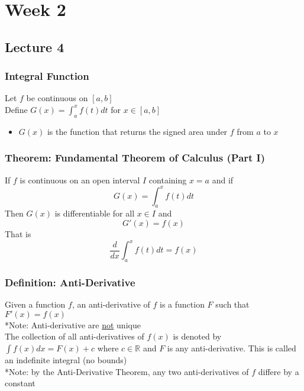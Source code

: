 \documentclass[12pt, letterpaper]{article}
\begin{document}
\section{Week 2}
\subsection{Lecture 4}
\subsubsection{Integral Function}
Let $f$ be continuous on $[a,b]$ \\
Define $G(x) = \displaystyle\int_{a}^{x}f(t)dt$ for $x\in[a,b]$
\begin{itemize}
    \item $G(x)$ is the function  that returns the signed area under $f$ from $a$ to $x$
\end{itemize}
\subsubsection{Theorem: Fundamental Theorem of Calculus (Part I)}
If $f$ is continuous on an open interval $I$ containing $x=a$ and if \[G(x) = \displaystyle\int_{a}^{x}f(t)dt\]
Then $G(x)$ is differentiable for all $x\in I$ and \[G'(x)=f(x)\] That is \[\frac{d}{dx}\displaystyle\int_{a}^{x}f(t)dt = f(x)\]
\subsubsection{Definition: Anti-Derivative}
Given a function $f$, an anti-derivative of $f$ is a function $F$ such that $F'(x)=f(x)$ \\
*Note: Anti-derivative are \underline{not} unique \\
The collection of all anti-derivatives of $f(x)$ is denoted by $\displaystyle\int f(x)dx = F(x)+c$
where $c\in\mathbb{R}$ and $F$ is any anti-derivative. This is called an indefinite integral (no bounds) \\
*Note: by the Anti-Derivative Theorem, any two anti-derivatives of $f$ differe by a constant
\end{document}
